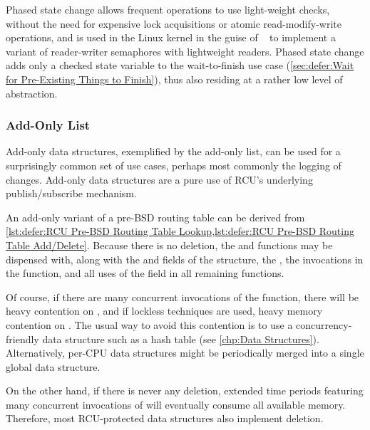 Phased state change allows frequent operations to use light-weight
checks, without the need for expensive lock acquisitions or atomic
read-modify-write operations, and is used in the Linux kernel in the
guise of ~\cite{OlegNesterov2013rcusync} to implement a
variant of reader-writer semaphores with lightweight readers.
Phased state change adds only a checked state variable
to the wait-to-finish use case
(\cref{sec:defer:Wait for Pre-Existing Things to Finish}),
thus also residing at a rather low level of abstraction.

\subsubsection{Add-Only List}
\label{sec:defer:Add-Only List}

Add-only data structures, exemplified by the add-only list, can be used
for a surprisingly common set of use cases, perhaps most commonly the
logging of changes.
Add-only data structures are a pure use of RCU's underlying
publish/subscribe mechanism.

An add-only variant of a pre-BSD routing table can be derived from
\cref{lst:defer:RCU Pre-BSD Routing Table Lookup,lst:defer:RCU Pre-BSD Routing Table Add/Delete}.
Because there is no deletion, the  and 
functions may be dispensed with, along with the 
and  fields of the  structure, the
, the  invocations in the
 function, and all uses of the  field
in all remaining functions.

Of course, if there are many concurrent invocations of the 
function, there will be heavy contention on , and if lockless
techniques are used, heavy memory contention on .
The usual way to avoid this contention is to use a concurrency-friendly
data structure such as a hash table (see \cref{chp:Data Structures}).
Alternatively, per-CPU data structures might be periodically merged
into a single global data structure.

On the other hand, if there is never any deletion, extended time periods
featuring many concurrent invocations of  will eventually
consume all available memory.
Therefore, most RCU-protected data structures also implement deletion.

\QuickQuizEnd


